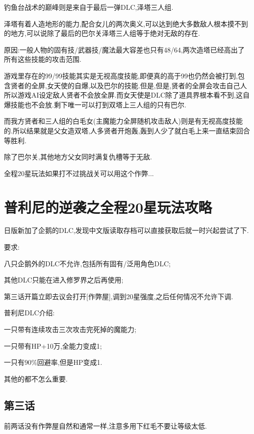 \begin{enumerate}
		钓鱼台战术的巅峰则是来自于最后一弹DLC,泽塔三人组.

		泽塔有着人造地形的能力,配合女儿的两次奥义,可以达到绝大多数敌人根本摸不到的地方,可以说除了最后的巴尔关泽塔三人组等于绝对无敌的存在.

		原因:一般人物的固有技/武器技/魔法最大容差也只有48/64,两次造塔已经高出了所有这些技能的攻击范围.

		游戏里存在的99/99技能其实是无视高度技能,即便真的高于99也仍然会被打到,包含贤者的全屏,女天使的自爆,以及巴尔的技能.但是,但是,贤者的全屏会攻击自己人所以游戏AI设定敌人贤者不会放全屏.而女天使是DLC除了道具界根本看不到,这自爆技能也不会放.剩下唯一可以打到双塔上三人组的只有巴尔.

		而我方贤者和三人组的白毛女(主魔能力全屏随机攻击敌人)则是有无视高度技能的.所以结果就是父女造双塔,人多贤者开炮轰,轰到人少了就白毛上来一直结束回合等胜利.

		除了巴尔关,其他地方父女同时满复仇槽等于无敌.

		全程20星玩法如果打不过挑战关可以用这个作弊...

	\end{enumerate}
	
	\newpage

	\section{普利尼的逆袭之全程20星玩法攻略}

	日版新加了企鹅的DLC,发现中文版读取存档可以直接获取后就一时兴起尝试了下.

	要求:

	八只企鹅外的DLC不允许,包括所有固有/泛用角色DLC;

	其他DLC只能在进入修罗界之后再使用;

	第三话开篇立即去议会打开[作弊屋],调到20星强度,之后任何情况不允许下调.

	普利尼DLC介绍:

	一只带有连续攻击三次攻击完死掉的魔能力;

	一只带有HP+10万,全能力变成1;

	一只有90\%回避率,但是HP变成1.

	其他的都不怎么重要.

	\newpage

	\subsection{第三话}

	前两话没有作弊屋自然和通常一样,注意多用下红毛不要让等级太低.

